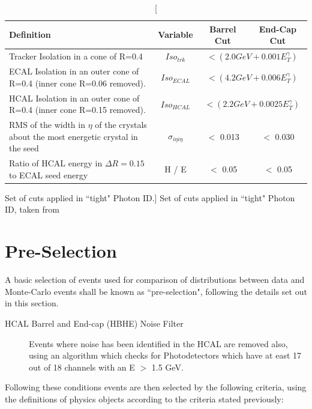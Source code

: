 \begin{table}[htbp]
\centering
\begin{tabular}{ m{6.9cm} c c c}
\hline
\hline
 \centering Definition & Variable & Barrel Cut & End-Cap Cut \\
\hline
\hline
Tracker Isolation in a cone of R=0.4 & $Iso_{trk}$ & \multicolumn{2}{c}{$< (2.0 GeV + 0.001E_{T}^{\gamma})$}\\
ECAL Isolation in an outer cone of R=0.4 (inner cone R=0.06 removed). & $Iso_{ECAL}$ & \multicolumn{2}{c}{$< (4.2 GeV + 0.006E_{T}^{\gamma})$}\\

HCAL Isolation in an outer cone of R=0.4 (inner cone R=0.15 removed). & $Iso_{HCAL}$ & \multicolumn{2}{c}{$< (2.2 GeV + 0.0025E_{T}^{\gamma})$}\\

RMS of the width in $\eta$ of the crystals about the most energetic crystal in the seed& $\sigma_{i \eta i \eta}$ & $<$ 0.013 & $<$ 0.030\\
Ratio of HCAL energy in $\Delta R = 0.15$ to ECAL seed energy & H / E & $<$ 0.05 & $<$ 0.05\\
\hline
\end{tabular}
\caption[Set of cuts applied in ``tight" Photon ID.]{\label{tab:pid} Set of cuts applied in ``tight" Photon ID, taken from \cite{EGM-10-006}}
\end{table}

\section{Pre-Selection}
\label{sec:press}
A basic selection of events used for comparison of distributions between data and Monte-Carlo events shall be known as ``pre-selection", following the details set out in this section.

\begin{description}


\item[HCAL Barrel and End-cap (HBHE) Noise Filter]{Events where noise has been identified in the HCAL are removed also, using an algorithm which checks for Photodetectors which have at east 17 out of 18 channels with an E $>$ 1.5 GeV.}
\end{description}
Following these conditions events are then selected by the following criteria, using the definitions of physics objects according to the criteria stated previously:

